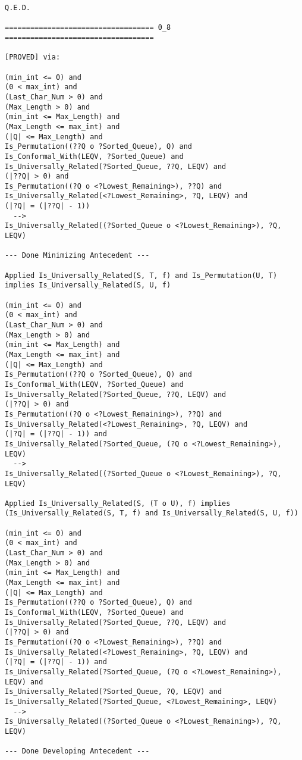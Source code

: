 \begin{lstlisting}[language=resolve]
Q.E.D.

=================================== 0_8 ===================================

[PROVED] via:

(min_int <= 0) and
(0 < max_int) and
(Last_Char_Num > 0) and
(Max_Length > 0) and
(min_int <= Max_Length) and
(Max_Length <= max_int) and
(|Q| <= Max_Length) and
Is_Permutation((??Q o ?Sorted_Queue), Q) and
Is_Conformal_With(LEQV, ?Sorted_Queue) and
Is_Universally_Related(?Sorted_Queue, ??Q, LEQV) and
(|??Q| > 0) and
Is_Permutation((?Q o <?Lowest_Remaining>), ??Q) and
Is_Universally_Related(<?Lowest_Remaining>, ?Q, LEQV) and
(|?Q| = (|??Q| - 1))
  -->
Is_Universally_Related((?Sorted_Queue o <?Lowest_Remaining>), ?Q, LEQV)

--- Done Minimizing Antecedent ---

Applied Is_Universally_Related(S, T, f) and Is_Permutation(U, T) implies Is_Universally_Related(S, U, f)

(min_int <= 0) and
(0 < max_int) and
(Last_Char_Num > 0) and
(Max_Length > 0) and
(min_int <= Max_Length) and
(Max_Length <= max_int) and
(|Q| <= Max_Length) and
Is_Permutation((??Q o ?Sorted_Queue), Q) and
Is_Conformal_With(LEQV, ?Sorted_Queue) and
Is_Universally_Related(?Sorted_Queue, ??Q, LEQV) and
(|??Q| > 0) and
Is_Permutation((?Q o <?Lowest_Remaining>), ??Q) and
Is_Universally_Related(<?Lowest_Remaining>, ?Q, LEQV) and
(|?Q| = (|??Q| - 1)) and
Is_Universally_Related(?Sorted_Queue, (?Q o <?Lowest_Remaining>), LEQV)
  -->
Is_Universally_Related((?Sorted_Queue o <?Lowest_Remaining>), ?Q, LEQV)

Applied Is_Universally_Related(S, (T o U), f) implies (Is_Universally_Related(S, T, f) and Is_Universally_Related(S, U, f))

(min_int <= 0) and
(0 < max_int) and
(Last_Char_Num > 0) and
(Max_Length > 0) and
(min_int <= Max_Length) and
(Max_Length <= max_int) and
(|Q| <= Max_Length) and
Is_Permutation((??Q o ?Sorted_Queue), Q) and
Is_Conformal_With(LEQV, ?Sorted_Queue) and
Is_Universally_Related(?Sorted_Queue, ??Q, LEQV) and
(|??Q| > 0) and
Is_Permutation((?Q o <?Lowest_Remaining>), ??Q) and
Is_Universally_Related(<?Lowest_Remaining>, ?Q, LEQV) and
(|?Q| = (|??Q| - 1)) and
Is_Universally_Related(?Sorted_Queue, (?Q o <?Lowest_Remaining>), LEQV) and
Is_Universally_Related(?Sorted_Queue, ?Q, LEQV) and
Is_Universally_Related(?Sorted_Queue, <?Lowest_Remaining>, LEQV)
  -->
Is_Universally_Related((?Sorted_Queue o <?Lowest_Remaining>), ?Q, LEQV)

--- Done Developing Antecedent ---


\end{lstlisting}
